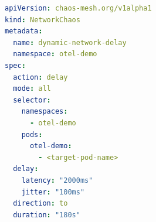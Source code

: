 \begin{lstlisting}[language=Yaml, caption={Dynamic Network Latency Chaos Manifest (\texttt{network-delay})}, label={code:network-chaos}]
apiVersion: chaos-mesh.org/v1alpha1
kind: NetworkChaos
metadata:
  name: dynamic-network-delay
  namespace: otel-demo
spec:
  action: delay
  mode: all
  selector:
    namespaces:
      - otel-demo
    pods:
      otel-demo:
        - <target-pod-name>
  delay:
    latency: "2000ms"
    jitter: "100ms"
  direction: to
  duration: "180s"
\end{lstlisting}
